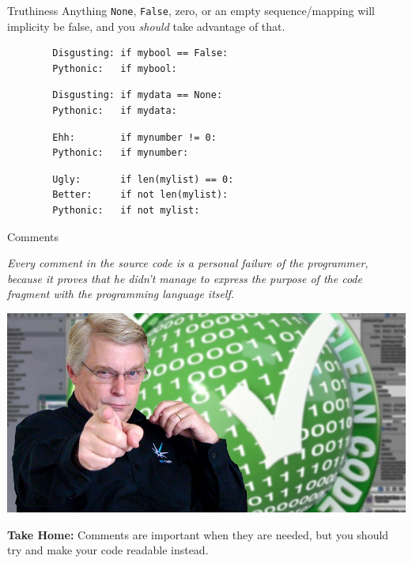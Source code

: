 \documentclass{lug}
\begin{document}
\begin{frame}[fragile]{Truthiness}
    Anything \texttt{None}, \texttt{False}, zero, or an empty sequence/mapping
    will implicity be false, and you \emph{should} take advantage of that.

    \begin{verbatim}
        Disgusting: if mybool == False:
        Pythonic:   if mybool:
    \end{verbatim}

    \begin{verbatim}
        Disgusting: if mydata == None:
        Pythonic:   if mydata:
    \end{verbatim}

    \begin{verbatim}
        Ehh:        if mynumber != 0:
        Pythonic:   if mynumber:
    \end{verbatim}

    \begin{verbatim}
        Ugly:       if len(mylist) == 0:
        Better:     if not len(mylist):
        Pythonic:   if not mylist:
    \end{verbatim}
\end{frame}

\begin{frame}{Comments}

    \textit{%
        Every comment in the source code is a personal failure of the
        programmer, because it proves that he didn’t manage to express the
        purpose of the code fragment with the programming language itself.
    }
    \hspace*{}

    \begin{center}
        \includegraphics[width=0.7\linewidth]{graphics/unclebob}
    \end{center}

    \small
    \textbf{Take Home:} Comments are important when they are needed, but you
    should try and make your code readable instead.

\end{frame}
\end{document}
